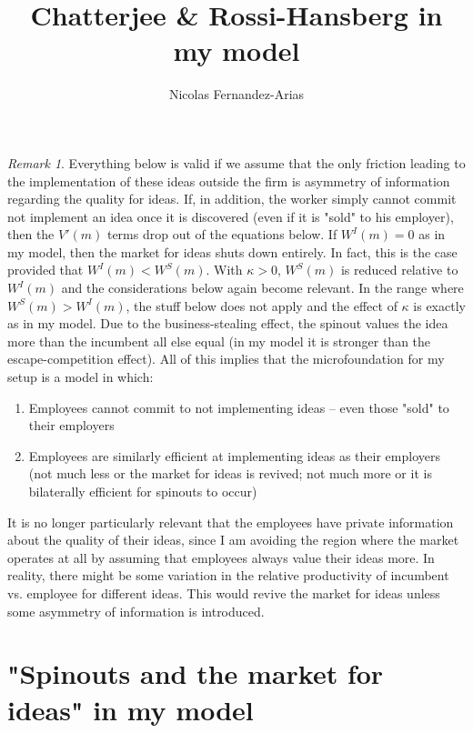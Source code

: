 \documentclass[12pt,english]{article}
\theoremstyle{remark}
\newtheorem{remark}{Remark}
\begin{document}
	
\title{Chatterjee \& Rossi-Hansberg in my model}
\author{Nicolas Fernandez-Arias}
\maketitle

\begin{remark}
	Everything below is valid if we assume that the only friction leading to the implementation of these ideas outside the firm is asymmetry of information regarding the quality for ideas. If, in addition, the worker simply cannot commit not implement an idea once it is discovered (even if it is "sold" to his employer), then the $V'(m)$ terms drop out of the equations below. If $W^I(m) = 0$ as in my model, then the market for ideas shuts down entirely. In fact, this is the case provided that $W^I(m) < W^S(m)$. With $\kappa > 0$, $W^S(m)$ is reduced relative to $W^I(m)$ and the considerations below again become relevant. In the range where $W^S(m) > W^I(m)$, the stuff below does not apply and the effect of $\kappa$ is exactly as in my model. Due to the business-stealing effect, the spinout values the idea more than the incumbent all else equal (in my model it is stronger than the escape-competition effect). All of this implies that the microfoundation for my setup is a model in which:
	\begin{enumerate}
		\item Employees cannot commit to not implementing ideas -- even those "sold" to their employers
		\item Employees are similarly efficient at implementing ideas as their employers (not much less or the market for ideas is revived; not much more or it is bilaterally efficient for spinouts to occur)
	\end{enumerate}
	It is no longer particularly relevant that the employees have private information about the quality of their ideas, since I am avoiding the region where the market operates at all by assuming that employees always value their ideas more. In reality, there might be some variation in the relative productivity of incumbent vs. employee for different ideas. This would revive the market for ideas unless some asymmetry of information is introduced.
\end{remark}

\section{"Spinouts and the market for ideas" in my model}
\end{document}
